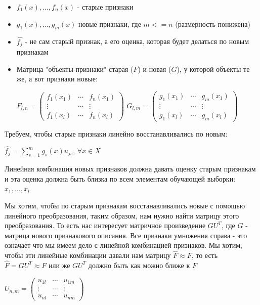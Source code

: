 \begin{itemize}
    \item $f_{1}(x), \dotsc, f_{n}(x)$ - старые признаки
    \item $g_{1}(x), \dots ,g_{m}(x)$ новые признаки, где $m<=n$ (размерность понижена)
    \item $\hat{f_j}$ - не сам старый признак, а его оценка, которая будет делаться по новым признакам
    \item Матрица "объекты-признаки" старая ($F$) и новая ($G$), у которой объекты те же, а вот признаки новые: \par
          $F_{l,n} =
              \begin{pmatrix}
                  f_1(x_1) & \cdots & f_n(x_1) \\
                  \vdots   & \cdots & \vdots   \\
                  f_1(x_l) & \cdots & f_n(x_l)
              \end{pmatrix}$
          $G_{l,m} =
              \begin{pmatrix}
                  g_1(x_1) & \cdots & g_m(x_1) \\
                  \vdots   & \cdots & \vdots   \\
                  g_1(x_l) & \cdots & g_m(x_l)
              \end{pmatrix}$
\end{itemize}

Требуем, чтобы старые признаки линейно восстанавливались по новым:\par
$\hat{f_j} = \displaystyle\sum_{s=1}^{m} g_s(x)u_{js}$, $\forall x \in X$\par Линейная комбинация новых признаков должна давать оценку старым признакам и эта оценка должна быть близка по всем элементам обучающей выборки: $x_1, \dotsc, x_l$

Мы хотим, чтобы по старым признакам восстанавливались новые с помощью линейного преобразования, таким образом, нам нужно найти матрицу этого преобразования. То есть нас интересует матричное произведение $GU^T$,
где $G$ - матрица нового признакового описания. Все признаки умножения справа - это означает что мы имеем дело с линейной комбинацией признаков. Мы хотим, чтобы эти линейные комбинации давали нам матрицу
$\hat{F} \approx F$, то есть $\hat{F} = GU^T \approx F$ или же $GU^T$ должно быть как можно ближе к $F$ \par
$U_{n,m} =
    \begin{pmatrix}
        u_{1l} & \cdots & u_{1m} \\
        \vdots & \cdots & \vdots \\
        u_{nl} & \cdots & u_{nm}
    \end{pmatrix}$\par

